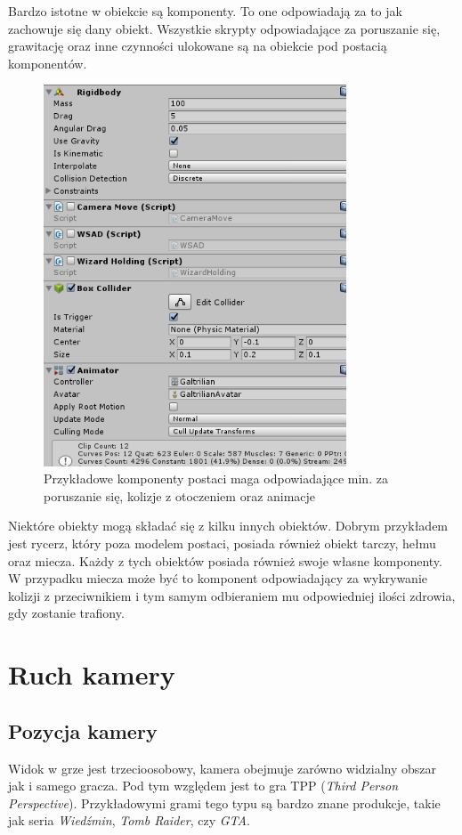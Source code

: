 \documentclass[openright]{xmgr}
\begin{document}
    Bardzo istotne w obiekcie są komponenty. To one odpowiadają za to jak zachowuje się dany obiekt. Wszystkie skrypty odpowiadające za poruszanie się, grawitację oraz inne czynności ulokowane są na obiekcie pod postacią komponentów.

    \begin{figure}[H]
      \center
      \includegraphics[width=9cm]{component.png}
      \caption{Przykładowe komponenty postaci maga odpowiadające min. za poruszanie się, kolizje z otoczeniem oraz animacje}
    \end{figure}

    Niektóre obiekty mogą składać się z kilku innych obiektów. Dobrym przykładem jest rycerz, który poza modelem postaci, posiada również obiekt tarczy, hełmu oraz miecza. Każdy z tych obiektów posiada również swoje własne komponenty. W przypadku miecza może być to komponent odpowiadający za wykrywanie kolizji z przeciwnikiem i tym samym odbieraniem mu odpowiedniej ilości zdrowia, gdy zostanie trafiony.

  \section{Ruch kamery}

    \subsection{Pozycja kamery}

        Widok w grze jest trzecioosobowy, kamera obejmuje zarówno widzialny obszar jak i samego gracza. Pod tym względem jest to gra TPP (\textit{Third Person Perspective}). Przykładowymi grami tego typu są bardzo znane produkcje, takie jak seria \textit{Wiedźmin}, \textit{Tomb Raider}, czy \textit{GTA}.
\end{document}
